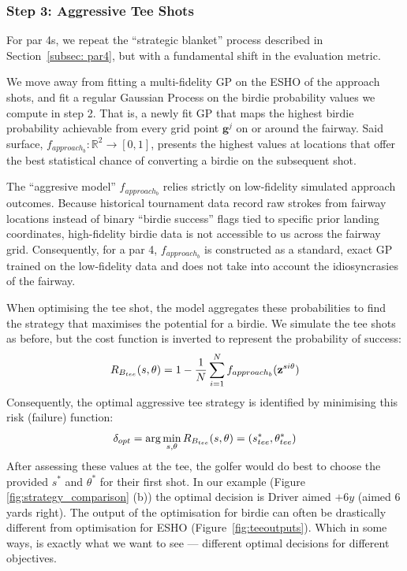 \documentclass[11pt, letterpaper]{article}
\begin{document}
\subsubsection{Step 3: Aggressive Tee Shots}

For par 4s, we repeat the ``strategic blanket'' process described in Section~\ref{subsec: par4}, but with a fundamental shift in the evaluation metric.

We move away from fitting a multi-fidelity GP on the ESHO of the approach shots, and fit a regular Gaussian Process on the birdie probability values we compute in step 2. That is, a newly fit GP that maps the highest birdie probability achievable from every grid point $\mathbf{g}^j$ on or around the fairway. Said surface, $f_{approach_b}: \mathbb{R}^2 \to [0,1]$, presents the highest values at locations that offer the best statistical chance of converting a birdie on the subsequent shot.

The ``aggresive model'' $f_{approach_b}$ relies strictly on low-fidelity simulated approach outcomes. Because historical tournament data record raw strokes from fairway locations instead of binary ``birdie success'' flags tied to specific prior landing coordinates, high-fidelity birdie data is not accessible to us across the fairway grid. Consequently, for a par 4, $f_{approach_b}$ is constructed as a standard, exact GP trained on the low-fidelity data and does not take into account the idiosyncrasies of the fairway.

When optimising the tee shot, the model aggregates these probabilities to find the strategy that maximises the potential for a birdie. We simulate the tee shots as before, but the cost function is inverted to represent the probability of success:
$$R_{B_{tee}}(s, \theta) = 1 - \frac{1}{N} \sum^N_{i =1} f_{approach_b}(\mathbf{z}^{si\theta})$$
Consequently, the optimal aggressive tee strategy is identified by minimising this risk (failure) function: 
\[\delta_{opt} =\arg\min_{s,\theta} R_{B_{tee}}(s, \theta) = (s^*_{tee}, \theta^*_{tee})\]
After assessing these values at the tee, the golfer would do best to choose the provided $s^*$ and $\theta^*$ for their first shot. \change In our example (Figure \ref{fig:strategy_comparison} (b)) the optimal decision is Driver aimed $+6y$ (aimed $6$ yards right).
The output of the optimisation for birdie can often be drastically different from optimisation for ESHO (Figure~\ref{fig:teeoutputs}). Which in some ways, is exactly what we want to see --- different optimal decisions for different objectives. 
\end{document}
